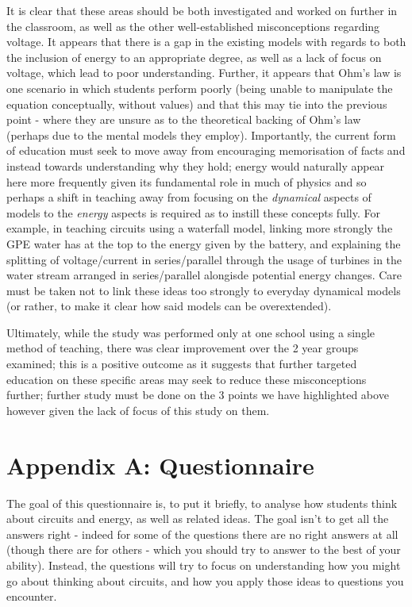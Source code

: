 \documentclass[a4paper,openany,nobib]{tufte-book}
\begin{document}
It is clear that these areas should be both investigated and worked on further in the classroom, as well as the other well-established misconceptions regarding voltage. It appears that there is a gap in the existing models with regards to both the inclusion of energy to an appropriate degree, as well as a lack of focus on voltage, which lead to poor understanding. Further, it appears that Ohm's law is one scenario in which students perform poorly (being unable to manipulate the equation conceptually, without values) and that this may tie into the previous point - where they are unsure as to the theoretical backing of Ohm's law (perhaps due to the mental models they employ).
Importantly, the current form of education must seek to move away from encouraging memorisation of facts and instead towards understanding why they hold; energy would naturally appear here more frequently given its fundamental role in much of physics and so perhaps a shift in teaching away from focusing on the \emph{dynamical} aspects of models to the \emph{energy} aspects is required as to instill these concepts fully. For example, in teaching circuits using a waterfall model, linking more strongly the GPE water has at the top to the energy given by the battery, and explaining the splitting of voltage/current in series/parallel through the usage of turbines in the water stream arranged in series/parallel alongisde potential energy changes. Care must be taken not to link these ideas too strongly to everyday dynamical models (or rather, to make it clear how said models can be overextended).

Ultimately, while the study was performed only at one school using a single method of teaching, there was clear improvement over the 2 year groups examined; this is a positive outcome as it suggests that further targeted education on these specific areas may seek to reduce these misconceptions further; further study must be done on the 3 points we have highlighted above however given the lack of focus of this study on them.
\backmatter
\chapter{Appendix A: Questionnaire}
The goal of this questionnaire is, to put it briefly, to analyse how students think about circuits and energy, as well as related ideas. The goal isn't to get all the answers right - indeed for some of the questions there are no right answers at all (though there are for others - which you should try to answer to the best of your ability). Instead, the questions will try to focus on understanding how you might go about thinking about circuits, and how you apply those ideas to questions you encounter.
\end{document}
